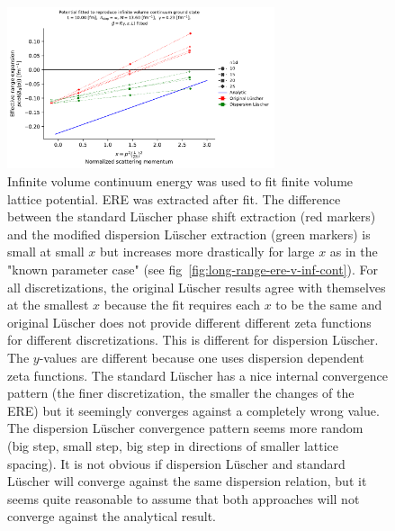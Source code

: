 \documentclass[
    aps,
    prl,
    showkeys,
    nofootinbib,
    floatfix
]{revtex4-1}
\begin{document}
\begin{figure}[!htb]
\includegraphics[width=0.7\textwidth]{figs/long-range-ere-v-fit.pdf}
\caption{
	\label{fig:long-range-ere-v-fit}
	Infinite volume continuum energy was used to fit finite volume lattice potential.
	ERE was extracted after fit.
	The difference between the standard Lüscher phase shift extraction (red markers) and the modified dispersion Lüscher extraction (green markers) is small at small $x$ but increases more drastically for large $x$ as in the "known parameter case" (see fig~\ref{fig:long-range-ere-v-inf-cont}).
	For all discretizations, the original Lüscher results agree with themselves at the smallest $x$ because the fit requires each $x$ to be the same and original Lüscher does not provide different different zeta functions for different discretizations.
	This is different for dispersion Lüscher.
	The $y$-values are different because one uses dispersion dependent zeta functions.
	The standard Lüscher has a nice internal convergence pattern (the finer discretization, the smaller the changes of the ERE) but it seemingly converges against a completely wrong value.
	The dispersion Lüscher convergence pattern seems more random (big step, small step, big step in directions of smaller lattice spacing).
	It is not obvious if dispersion Lüscher and standard Lüscher will converge against the same dispersion relation, but it seems quite reasonable to assume that both approaches will not converge against the analytical result.
}
\end{figure}
\end{document}
